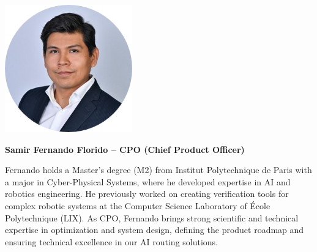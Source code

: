 \documentclass[english]{article}
\begin{document}
\noindent
\begin{minipage}[c]{0.2\textwidth}
    \centering
    \includegraphics[width=0.9\linewidth]{images/fernando.jpg}
\end{minipage}%
\hfill
\begin{minipage}[c]{0.75\textwidth}
    \textbf{\large Samir Fernando Florido – CPO (Chief Product Officer)}
    \vspace{0.3em}

    \noindent Fernando holds a Master's degree (M2) from Institut Polytechnique de Paris with a major in Cyber-Physical Systems, where he developed expertise in AI and robotics engineering.
    He previously worked on creating verification tools for complex robotic systems at the Computer Science Laboratory of École Polytechnique (LIX).
    As CPO, Fernando brings strong scientific and technical expertise in optimization and system design, defining the product roadmap and ensuring technical excellence in our AI routing solutions.
\end{minipage}

\vspace{1.5em}
\end{document}
